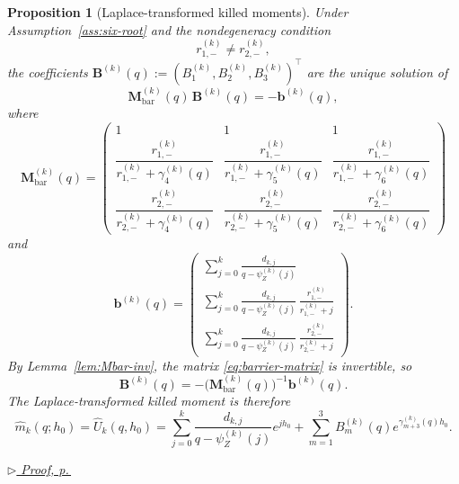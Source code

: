 \documentclass[11pt]{article}
\newcommand{\proofref}[1]{%
  \par\noindent\hfill{\small\itshape\hyperref[#1]{$\triangleright$ Proof, p.\,\pageref{#1}}}}
\theoremstyle{plain}
\newtheorem{proposition}[theorem]{Proposition}
\theoremstyle{definition}
\theoremstyle{remark}
\begin{document}
\begin{proposition}[Laplace-transformed killed moments]\label{prop:Ubar}
Under Assumption~\ref{ass:six-root} and the nondegeneracy condition
\begin{equation}\label{eq:nondeg-bar}
r_{1,-}^{(k)}\neq r_{2,-}^{(k)},
\end{equation}
the coefficients
$\mathbf{B}^{(k)}(q):=(B_1^{(k)},B_2^{(k)},B_3^{(k)})^\top$ are the unique solution of
\begin{equation}\label{eq:barrier-system}
\mathbf{M}_{\mathrm{bar}}^{(k)}(q)\,\mathbf{B}^{(k)}(q)=-\mathbf{b}^{(k)}(q),
\end{equation}
where
\begin{equation}\label{eq:barrier-matrix}
\mathbf{M}_{\mathrm{bar}}^{(k)}(q)=
\begin{pmatrix}
1 & 1 & 1\\[6pt]
\dfrac{r_{1,-}^{(k)}}{r_{1,-}^{(k)}+\gamma_4^{(k)}(q)} &
\dfrac{r_{1,-}^{(k)}}{r_{1,-}^{(k)}+\gamma_5^{(k)}(q)} &
\dfrac{r_{1,-}^{(k)}}{r_{1,-}^{(k)}+\gamma_6^{(k)}(q)}\\[12pt]
\dfrac{r_{2,-}^{(k)}}{r_{2,-}^{(k)}+\gamma_4^{(k)}(q)} &
\dfrac{r_{2,-}^{(k)}}{r_{2,-}^{(k)}+\gamma_5^{(k)}(q)} &
\dfrac{r_{2,-}^{(k)}}{r_{2,-}^{(k)}+\gamma_6^{(k)}(q)}
\end{pmatrix}
\end{equation}
and
\begin{equation}\label{eq:barrier-forcing}
\mathbf{b}^{(k)}(q)
=
\begin{pmatrix}
\displaystyle\sum_{j=0}^{k}\frac{d_{k,j}}{q-\psi_Z^{(k)}(j)}\\[10pt]
\displaystyle\sum_{j=0}^{k}\frac{d_{k,j}}{q-\psi_Z^{(k)}(j)}\,
\frac{r_{1,-}^{(k)}}{r_{1,-}^{(k)}+j}\\[10pt]
\displaystyle\sum_{j=0}^{k}\frac{d_{k,j}}{q-\psi_Z^{(k)}(j)}\,
\frac{r_{2,-}^{(k)}}{r_{2,-}^{(k)}+j}
\end{pmatrix}.
\end{equation}
By Lemma~\ref{lem:Mbar-inv}, the matrix \eqref{eq:barrier-matrix} is invertible, so
\[
\mathbf{B}^{(k)}(q)
=-\bigl(\mathbf{M}_{\mathrm{bar}}^{(k)}(q)\bigr)^{-1}\mathbf{b}^{(k)}(q).
\]
The Laplace-transformed killed moment is therefore
\begin{equation}\label{eq:Uhat-zero}
\boxed{
\widehat m_k(q;h_0)
=\widehat U_k(q,h_0)
=\sum_{j=0}^{k}\frac{d_{k,j}}{q-\psi_Z^{(k)}(j)}e^{jh_0}
+\sum_{m=1}^{3}B_m^{(k)}(q)e^{\gamma_{m+3}^{(k)}(q)h_0}.}
\end{equation}
\end{proposition}
\proofref{proof:prop:Ubar}
\end{document}
